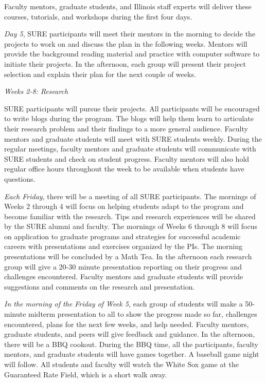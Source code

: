 \documentclass[11pt]{NSFamsart}
\begin{document}
 
Faculty mentors, graduate students, and Illinois staff experts will deliver these courses, tutorials, and workshops during the first four days.

\emph{Day 5}, SURE participants will meet their mentors in the morning to decide the projects to work on and discuss the plan in the following weeks. Mentors will provide the background
reading material and practice with computer software to initiate their projects. In the afternoon, each group will present their project selection and explain their plan for the next couple of weeks.


\centerline{\emph{Weeks 2-8: Research}}

SURE participants will pursue their projects. All participants will be encouraged to write blogs \cite{Hig21a} during the program. The blogs will help them learn to articulate their research problem and their findings to a more general audience. Faculty mentors and graduate
students will meet with SURE students weekly. During the regular meetings, faculty mentors and graduate students will communicate with SURE students and check on student progress. Faculty mentors will also hold regular office hours throughout the week to be available when students have questions.

\emph{Each Friday}, there will be a meeting of all SURE participants. The mornings of Weeks 2 through 4 will focus on helping students adapt to the program and become familiar with the research. Tips and research experiences will be shared by the SURE alumni and faculty. The mornings of Weeks 6 through 8 will focus on application to graduate programs and strategies for successful academic careers with presentations and exercises organized by the PIs. The morning presentations will  be concluded by a Math Tea.  In the afternoon each research group will give a 20-30 minute presentation reporting on their progress and challenges encountered. Faculty mentors and graduate students will provide suggestions and comments on the research and presentation.

\emph{In the morning of the Friday of Week 5,}
each group of students will make a 50-minute midterm presentation to all to show the progress made so far, challenges encountered, plans for the next few weeks, and help needed. Faculty mentors,
graduate students, and peers will give feedback and guidance. In the afternoon, there will be a BBQ cookout. During the BBQ time, all the participants, faculty mentors, and graduate students will have games together. A baseball game night  
will follow. All students and faculty will watch the White Sox game at the Guaranteed Rate Field, which is a short walk away.
\end{document}
